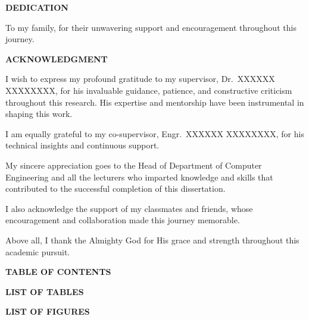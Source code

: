 \documentclass[12pt,a4paper,oneside]{report}
\begin{document}
\thispagestyle{empty}
\begin{center}
    {\Large\bfseries DEDICATION}
\end{center}
\vspace{1cm}

To my family, for their unwavering support and encouragement throughout this journey.

\vfill
\newpage

\thispagestyle{empty}
\begin{center}
    {\Large\bfseries ACKNOWLEDGMENT}
\end{center}
\vspace{0.5cm}

I wish to express my profound gratitude to my supervisor, Dr.~XXXXXX XXXXXXXX, for his invaluable guidance, patience, and constructive criticism throughout this research. His expertise and mentorship have been instrumental in shaping this work.

I am equally grateful to my co-supervisor, Engr.~XXXXXX XXXXXXXX, for his technical insights and continuous support.

My sincere appreciation goes to the Head of Department of Computer Engineering and all the lecturers who imparted knowledge and skills that contributed to the successful completion of this dissertation.

I also acknowledge the support of my classmates and friends, whose encouragement and collaboration made this journey memorable.

Above all, I thank the Almighty God for His grace and strength throughout this academic pursuit.

\vfill
\newpage

\thispagestyle{empty}
\begin{center}
    {\Large\bfseries TABLE OF CONTENTS}
\end{center}
\vspace{0.5cm}
\tableofcontents
\newpage

\thispagestyle{empty}
\begin{center}
    {\Large\bfseries LIST OF TABLES}
\end{center}
\vspace{0.5cm}
\listoftables
\newpage

\thispagestyle{empty}
\begin{center}
    {\Large\bfseries LIST OF FIGURES}
\end{center}
\vspace{0.5cm}
\listoffigures
\newpage
\end{document}
